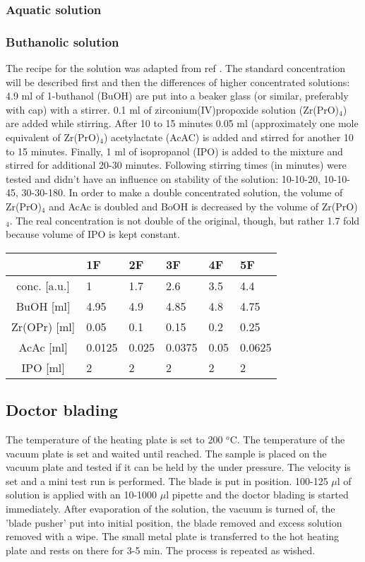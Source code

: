 \documentclass[a4paper]{article}
\begin{document}
\subsubsection{Aquatic solution}
\subsubsection{Buthanolic solution}
\label{sec:sol}
The recipe for the solution was adapted from ref \cite{Hu2016}.
The standard concentration will be described first and then the differences of higher concentrated solutions:
4.9 ml of 1-buthanol (BuOH) are put into a beaker glass (or similar, preferably with cap) with a stirrer. 
0.1 ml of zirconium(IV)propoxide solution (Zr(PrO)$_4$) are added while stirring.  
After 10 to 15 minutes 0.05 ml (approximately one mole equivalent of Zr(PrO)$_4$) acetylactate (AcAC) is added and stirred for another 10 to 15 minutes. 
Finally, 1 ml of isopropanol (IPO) is added to the mixture and stirred for additional 20-30 minutes. 
Following stirring times (in minutes) were tested and didn't have an influence on stability of the solution: 10-10-20, 10-10-45, 30-30-180. 
In order to make a double concentrated solution, the volume of Zr(PrO)$_4$ and AcAc is doubled and BoOH is decreased by the volume of Zr(PrO)$_4$. 
The real concentration is not double of the original, though, but rather 1.7 fold because volume of IPO is kept constant.

\begin{table}[h]
	\centering
	\begin{tabular}{clllll}
		\hline
				&1F		&2F		&3F		&4F		&5F		\\
		\hline
		conc. [a.u.]	&1		&1.7	&2.6	&3.5	&4.4	\\
		\hline
		BuOH [ml]		&4.95	&4.9	&4.85	&4.8	&4.75	\\
		Zr(OPr) [ml]	&0.05	&0.1	&0.15	&0.2	&0.25	\\
		AcAc [ml]		&0.0125	&0.025	&0.0375	&0.05	&0.0625	\\
		IPO [ml]		&2		&2		&2		&2		&2		\\
		\hline
	\end{tabular}
\end{table}

\subsection{Doctor blading}
\label{sec:DB}
The temperature of the heating plate is set to 200 $^o$C.
The temperature of the vacuum plate is set and waited until reached.
The sample is placed on the vacuum plate and tested if it can be held by the under pressure.
The velocity is set and a mini test run is performed. 
The blade is put in position. 
100-125 $\mu$l of solution is applied with an 10-1000 $\mu$l pipette and the doctor blading is started immediately. 
After evaporation of the solution, the vacuum is turned of, the 'blade pusher' put into initial position, the blade removed and excess solution removed with a wipe. 
The small metal plate is transferred to the hot heating plate and rests on there for 3-5 min. 
The process is repeated as wished. 
\end{document}
